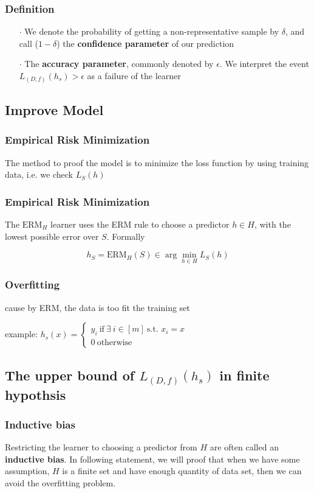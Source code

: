 \documentclass[xcolor=dvipsnames]{beamer}
\theoremstyle{plain}
\begin{document}
\begin{frame}
	\frametitle{Definition}
	\begin{enumerate}
		\item[$\cdot$] We denote the probability of getting a non-representative sample by $\delta$, and call ($1 - \delta$) the \textbf{confidence parameter} of our prediction
		\item[$\cdot$] The \textbf{accuracy parameter}, commonly denoted by $\epsilon$. We interpret the event $L_{(D,f)}(h_s) > \epsilon$ as a failure of the learner
	\end{enumerate}
	
\end{frame}

\begin{frame}
	\section{Improve Model}
	\frametitle{Empirical Risk Minimization}
	
	The method to proof the model is to minimize the loss function by using training data, i.e. we check $L_S(h)$
	
\end{frame}

\begin{frame}
	\frametitle{Empirical Risk Minimization}
	The $\text{ERM}_H$ learner uses the ERM rule to choose a predictor $h \in H$, with the lowest possible error over $S$. Formally

$$h_S = \text{ERM}_H(S) \in \arg\min_{h \in H}L_S(h)$$
	
\end{frame}

\begin{frame}
	\frametitle{Overfitting}
	cause by ERM, the data is too fit the training set

example: $h_s(x) = \begin{cases}
	y_i~\text{if}~\exists~i \in [m]~\text{s.t. } x_i = x\\
	0~\text{otherwise}
\end{cases}$
	
\end{frame}


\begin{frame}
	\section{The upper bound of $L_{(D,f)}(h_s)$ in finite hypothsis}
	\frametitle{Inductive bias}
	Restricting the learner to choosing a predictor from $H$ are often called an \textbf{inductive bias}. In following statement, we will proof that when we have some assumption, $H$ is a finite set and have enough quantity of data set, then we can avoid the overfitting problem.
	
	
\end{frame}
\end{document}
